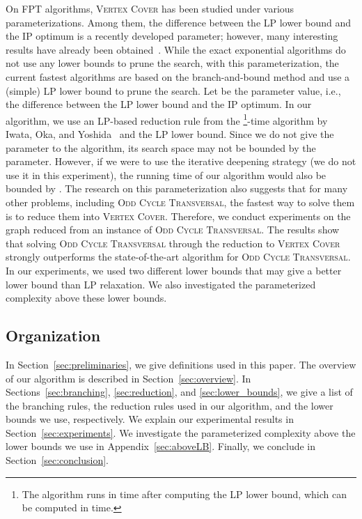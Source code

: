 \documentclass[11pt]{article}
\begin{document}
On FPT algorithms, \textsc{Vertex Cover} has been studied under various parameterizations.
Among them, the difference between the LP lower bound and the IP optimum is a recently developed parameter; however,
many interesting results have already been
obtained~\cite{DBLP:journals/toct/CyganPPW13,DBLP:journals/corr/abs-1203-0833,bip2/iwata14,DBLP:conf/soda/Wahlstrom14}.
While the exact exponential algorithms do not use any lower bounds to prune the search, with this parameterization,
the current fastest algorithms are based on the branch-and-bound method and use a (simple) LP lower bound to prune the
search.
Let  be the parameter value, i.e., the difference between the LP lower bound and the IP optimum.
In our algorithm, we use an LP-based reduction rule from the \footnote{The algorithm runs in
 time after computing the LP lower bound, which can be computed in  time.}-time
algorithm by Iwata, Oka, and Yoshida~\cite{bip2/iwata14} and the LP lower bound.
Since we do not give the parameter to the algorithm, its search space may not be bounded by the
parameter.
However, if we were to use the iterative deepening strategy (we do not use it in this experiment), the running time of
our algorithm would also be bounded by .
The research on this parameterization also suggests that for many other problems, including \textsc{Odd Cycle
Transversal}, the fastest way to solve them is to reduce them into \textsc{Vertex Cover}.
Therefore, we conduct experiments on the graph reduced from an instance of \textsc{Odd Cycle Transversal}.
The results show that solving \textsc{Odd Cycle Transversal} through the reduction to \textsc{Vertex Cover}
strongly outperforms the state-of-the-art algorithm for \textsc{Odd Cycle Transversal}.
In our experiments, we used two different lower bounds that may give a better lower bound than LP relaxation.
We also investigated the parameterized complexity above these lower bounds.

\subsection{Organization}
In Section~\ref{sec:preliminaries}, we give definitions used in this paper.
The overview of our algorithm is described in Section~\ref{sec:overview}.
In Sections~\ref{sec:branching}, \ref{sec:reduction}, and \ref{sec:lower_bounds}, we give a list of the branching rules, the reduction
rules used in our algorithm, and the lower bounds we use, respectively.
We explain our experimental results in Section~\ref{sec:experiments}.
We investigate the parameterized complexity above the lower bounds we use in Appendix~\ref{sec:aboveLB}.
Finally, we conclude in Section~\ref{sec:conclusion}.
\end{document}
